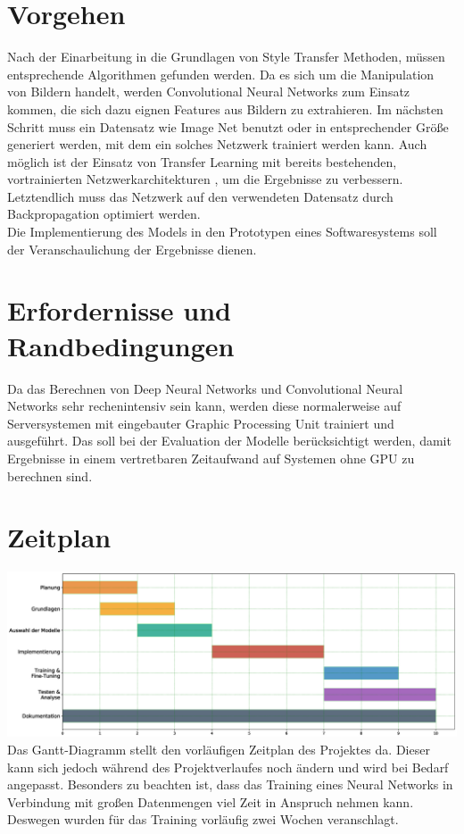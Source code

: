 \section{Vorgehen}
Nach der Einarbeitung in die Grundlagen von Style Transfer \cite{DBLP:journals/corr/GatysEB15a} \cite{DBLP:journals/corr/JohnsonAL16} Methoden,
müssen entsprechende Algorithmen gefunden werden. Da es sich um die Manipulation von Bildern handelt, werden Convolutional Neural Networks
\cite{lecun-gradientbased-learning-applied-1998} zum Einsatz kommen, die sich dazu eignen Features aus Bildern zu extrahieren. 
Im nächsten Schritt muss ein Datensatz wie Image Net \cite{imagenet_cvpr09} benutzt oder in entsprechender Größe generiert werden, mit dem ein solches Netzwerk trainiert 
werden kann. Auch möglich ist der Einsatz von Transfer Learning mit bereits bestehenden, vortrainierten Netzwerkarchitekturen
\cite{DBLP:journals/corr/SimonyanZ14a}, um die Ergebnisse zu verbessern. Letztendlich muss das Netzwerk auf den verwendeten Datensatz durch
Backpropagation \cite{doi:10.1162/neco.1989.1.4.541} optimiert werden.
\\
Die Implementierung des Models in den Prototypen eines Softwaresystems soll der Veranschaulichung der Ergebnisse dienen.

\pagebreak

\section{Erfordernisse und Randbedingungen}
Da das Berechnen von Deep Neural Networks und Convolutional Neural Networks sehr rechenintensiv sein kann,
werden diese normalerweise auf Serversystemen mit eingebauter Graphic Processing Unit trainiert und ausgeführt. Das soll bei der Evaluation der 
Modelle berücksichtigt werden, damit Ergebnisse in einem vertretbaren Zeitaufwand auf Systemen ohne GPU zu berechnen sind.

\section{Zeitplan}
\includegraphics[width=1.00\textwidth]{resources/gantt.eps}
Das Gantt-Diagramm stellt den vorläufigen Zeitplan des Projektes da.
Dieser kann sich jedoch während des Projektverlaufes noch ändern und wird bei Bedarf angepasst.
Besonders zu beachten ist, dass das Training eines Neural Networks in Verbindung mit großen Datenmengen viel Zeit in Anspruch nehmen kann.
Deswegen wurden für das Training vorläufig zwei Wochen veranschlagt.

